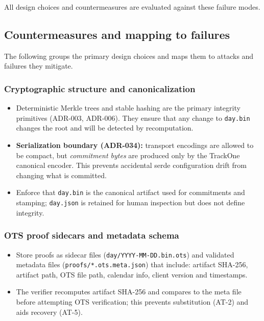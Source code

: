 All design choices and countermeasures are evaluated against these failure modes.

\subsection{Countermeasures and mapping to failures}
The following groups the primary design choices and maps them to attacks and failures they mitigate.

\subsubsection{Cryptographic structure and canonicalization}
\begin{itemize}[nosep]
  \item Deterministic Merkle trees and stable hashing are the primary integrity primitives (\ac{ADR}-003, \ac{ADR}-006).
  They ensure that any change to \texttt{day.bin} changes the root and will be detected by recomputation.
  \item \textbf{Serialization boundary (ADR-034):} transport encodings are allowed to be compact, but \emph{commitment bytes} are produced only by the TrackOne canonical encoder.
  This prevents accidental serde configuration drift from changing what is committed.
  \item Enforce that \texttt{day.bin} is the canonical artifact used for commitments and stamping; \texttt{day.json} is retained for human inspection but does not define integrity.
\end{itemize}

\subsubsection{OTS proof sidecars and metadata schema}
\begin{itemize}[nosep]
  \item Store proofs as sidecar files (\texttt{day/YYYY-MM-DD.bin.ots}) and validated metadata files (\texttt{proofs/*.ots.meta.json}) that include: artifact \ac{SHA}-256, artifact path, \ac{OTS} file path, calendar info, client version and timestamps.
  \item The verifier recomputes artifact \ac{SHA}-256 and compares to the meta file before attempting \ac{OTS} verification; this prevents substitution (AT-2) and aids recovery (AT-5).
\end{itemize}

